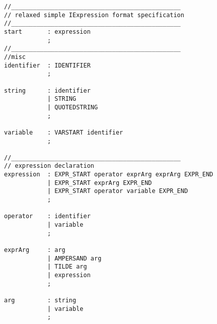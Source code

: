
\label{yaccexpr}

\begin{verbatim}
//_______________________________________________
// relaxed simple IExpression format specification
//_______________________________________________
start       : expression            
            ;
//_______________________________________________
//misc
identifier  : IDENTIFIER            
            ;

string      : identifier
            | STRING                
            | QUOTEDSTRING            
            ;

variable    : VARSTART identifier    
            ;

//_______________________________________________
// expression declaration
expression  : EXPR_START operator exprArg exprArg EXPR_END    
            | EXPR_START exprArg EXPR_END                    
            | EXPR_START operator variable EXPR_END            
            ;

operator    : identifier
            | variable    
            ;

exprArg     : arg
            | AMPERSAND arg    
            | TILDE arg    
            | expression
            ;

arg         : string    
            | variable    
            ;
\end{verbatim}
